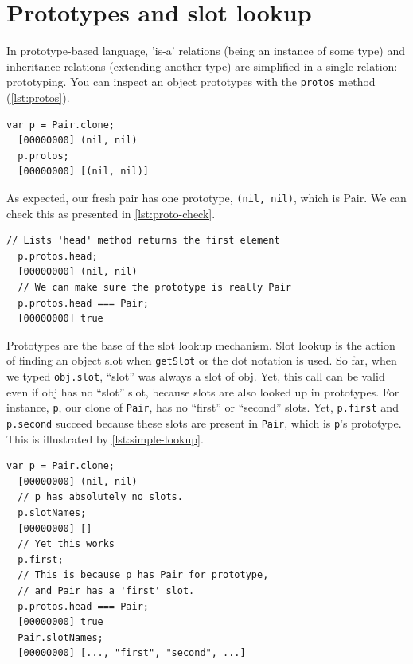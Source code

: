 \documentclass[openright,twoside,12pt]{report}
\newcommand{\lst}[1]{\autoref{lst:#1}}
\begin{document}
\section{Prototypes and slot lookup}

In prototype-based language, 'is-a' relations (being an instance of
some type) and inheritance relations (extending another type) are
simplified in a single relation: prototyping. You can inspect an
object prototypes with the \texttt{protos} method (\lst{protos}).

\begin{lstlisting}[caption=Inspecting prototypes, label=lst:protos]
  var p = Pair.clone;
  [00000000] (nil, nil)
  p.protos;
  [00000000] [(nil, nil)]
\end{lstlisting}

As expected, our fresh pair has one prototype, \lstinline|(nil, nil)|,
which is Pair. We can check this as presented in \lst{proto-check}.

\begin{lstlisting}[caption=Checking the prototype, label=lst:proto-check]
  // Lists 'head' method returns the first element
  p.protos.head;
  [00000000] (nil, nil)
  // We can make sure the prototype is really Pair
  p.protos.head === Pair;
  [00000000] true
\end{lstlisting}

Prototypes are the base of the slot lookup mechanism. Slot lookup is
the action of finding an object slot when \texttt{getSlot} or the dot
notation is used. So far, when we typed \lstinline|obj.slot|, ``slot''
was always a slot of obj. Yet, this call can be valid even if obj has
no ``slot'' slot, because slots are also looked up in prototypes. For
instance, \lstinline|p|, our clone of \lstinline|Pair|, has no
``first'' or ``second'' slots. Yet, \lstinline|p.first| and
\lstinline|p.second| succeed because these slots are present in
\lstinline|Pair|, which is \lstinline|p|'s prototype. This is
illustrated by \lst{simple-lookup}.

\begin{lstlisting}[caption=Slot found by lookup, label=lst:simple-lookup]
  var p = Pair.clone;
  [00000000] (nil, nil)
  // p has absolutely no slots.
  p.slotNames;
  [00000000] []
  // Yet this works
  p.first;
  // This is because p has Pair for prototype,
  // and Pair has a 'first' slot.
  p.protos.head === Pair;
  [00000000] true
  Pair.slotNames;
  [00000000] [..., "first", "second", ...]
\end{lstlisting}
\end{document}
